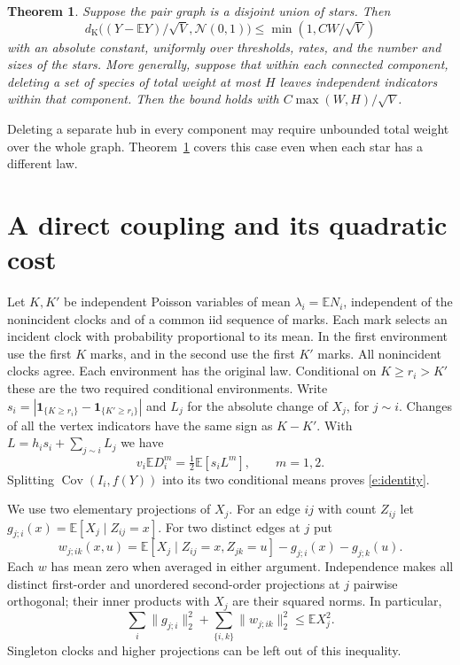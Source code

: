\documentclass[11pt]{article}
\newtheorem{theorem}{Theorem}[section]
\newcommand{\E}{\mathbb E}
\newcommand{\Cov}{\operatorname{Cov}}
\newcommand{\ind}{\mathbf1}
\newcommand{\dK}{d_{\mathrm K}}
\newcommand{\Nlaw}{\mathcal N(0,1)}
\numberwithin{equation}{section}
\begin{document}
\begin{theorem}\label{t:block}
Suppose the pair graph is a disjoint union of stars. Then
\[
 \dK\big((Y-\E Y)/\sqrt V,\Nlaw\big)\le\min(1,CW/\sqrt V)
\]
with an absolute constant, uniformly over thresholds, rates, and the number and sizes of
the stars. More generally, suppose that within each connected component, deleting a set
of species of total weight at most $H$ leaves independent indicators within that component.
Then the bound holds with $C\max(W,H)/\sqrt V$.
\end{theorem}
Deleting a separate hub in every component may require unbounded total weight over the
whole graph. Theorem~\ref{t:block} covers this case even when each star has a different law.

\section{A direct coupling and its quadratic cost}
Let $K,K'$ be independent Poisson variables of mean $\lambda_i=\E N_i$, independent of the
nonincident clocks and of a common iid sequence of marks. Each mark selects an incident clock
with probability proportional to its mean. In the first environment use the first $K$ marks,
and in the second use the first $K'$ marks. All nonincident clocks agree. Each environment
has the original law. Conditional on $K\ge r_i>K'$ these are the two required conditional
environments. Write $s_i=|\ind_{\{K\ge r_i\}}-\ind_{\{K'\ge r_i\}}|$ and $L_j$ for the
absolute change of $X_j$, for $j\sim i$. Changes of all the vertex indicators have the same
sign as $K-K'$. With $L=h_i s_i+\sum_{j\sim i}L_j$ we have
\begin{equation}\label{e:sym}
 v_i\E D_i^m=\tfrac12\E[s_i L^m],\qquad m=1,2.
\end{equation}
Splitting $\Cov(I_i,f(Y))$ into its two conditional means proves \eqref{e:identity}.

We use two elementary projections of $X_j$. For an edge $ij$ with count $Z_{ij}$ let
$g_{j;i}(x)=\E[X_j\mid Z_{ij}=x]$. For two distinct edges at $j$ put
\[
 w_{j;ik}(x,u)=\E[X_j\mid Z_{ij}=x,Z_{jk}=u]-g_{j;i}(x)-g_{j;k}(u).
\]
Each $w$ has mean zero when averaged in either argument. Independence makes all distinct
first-order and unordered second-order projections at $j$ pairwise orthogonal; their
inner products with $X_j$ are their squared norms. In particular,
\begin{equation}\label{e:bessel}
 \sum_i\|g_{j;i}\|_2^2+\sum_{\{i,k\}}\|w_{j;ik}\|_2^2\le\E X_j^2 .
\end{equation}
Singleton clocks and higher projections can be left out of this inequality.
\end{document}
